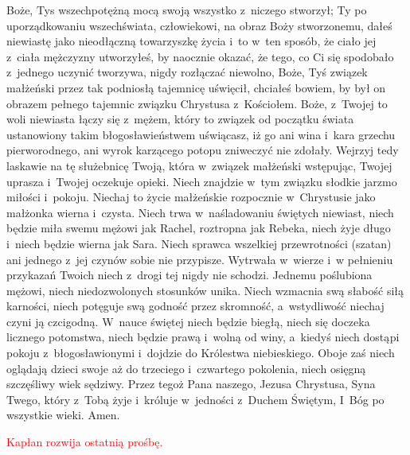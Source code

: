 \begin{Parallel}[v]{0.485\textwidth}{0.485\textwidth}
{Boże, Tys wszechpotężną mocą swoją wszystko z~niczego stworzył; Ty po uporządkowaniu wszechświata, człowiekowi, na obraz Boży stworzonemu, dałeś niewiastę jako nieodłączną towarzyszkę życia i~to w~ten sposób, że ciało jej z~ciała mężczyzny utworzyłeś, by naocznie okazać, że tego, co Ci się spodobało z~jednego uczynić tworzywa, nigdy rozłączać niewolno, Boże, Tyś związek małżeński przez tak podniosłą tajemnicę uświęcił, chciałeś bowiem, by był on obrazem pełnego tajemnic związku Chrystusa z~Kościołem. Boże, z~Twojej to woli niewiasta łączy się z~mężem, który to związek od początku świata ustanowiony takim błogosławieństwem uświącasz, iż go ani wina i~kara grzechu pierworodnego, ani wyrok karzącego potopu zniweczyć nie zdołały. Wejrzyj tedy laskawie na tę służebnicę Twoją, która w~związek małżeński wstępując, Twojej uprasza i~Twojej oczekuje opieki. Niech znajdzie w~tym związku słodkie jarzmo miłości i~pokoju. Niechaj to życie małżeńskie rozpocznie w~Chrystusie jako małżonka wierna i~czysta. Niech trwa w~naśladowaniu świętych niewiast, niech będzie miła swemu mężowi jak Rachel, roztropna jak Rebeka, niech żyje długo i~niech będzie wierna jak Sara. Niech sprawca wszelkiej przewrotności (szatan) ani jednego z~jej czynów sobie nie przypisze. Wytrwała w~wierze i~w pełnieniu przykazań Twoich niech z~drogi tej nigdy nie schodzi. Jednemu poślubiona mężowi, niech niedozwolonych stosunków unika. Niech wzmacnia swą słabość siłą karności, niech potęguje swą godność przez skromność, a~wstydliwość niechaj czyni ją czcigodną. W~nauce świętej niech będzie biegłą, niech się doczeka licznego potomstwa, niech będzie prawą i~wolną od winy, a~kiedyś niech dostąpi pokoju z~błogosławionymi i~dojdzie do Królestwa niebieskiego. Oboje zaś niech oglądają dzieci swoje aż do trzeciego i~czwartego pokolenia, niech osięgną szczęśliwy wiek sędziwy. Przez tegoż Pana naszego, Jezusa Chrystusa, Syna Twego, który z~Tobą żyje i~króluje w~jedności z~Duchem Świętym, I~Bóg po wszystkie wieki. Amen.
}
\end{Parallel}

\begin{center}
\textcolor{red}{Kapłan rozwija ostatnią prośbę.}
\end{center}

